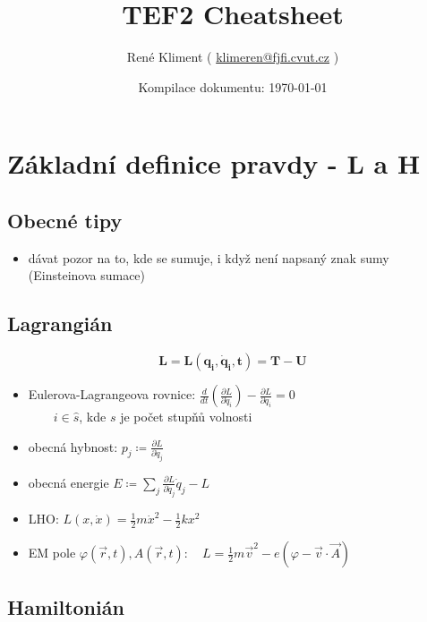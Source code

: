 \documentclass[a5paper,12pt]{article}
\author{
  René Kliment 
  ( \href{mailto:klimeren@fjfi.cvut.cz}{klimeren@fjfi.cvut.cz} )
}
\title{TEF2 Cheatsheet}
\date{Kompilace dokumentu: \today}
\begin{document}
\maketitle
\tableofcontents

\newpage


\section{Základní definice pravdy - L a H}

\subsection*{Obecné tipy}
\begin{itemize}
 \item dávat pozor na to, kde se sumuje, i když není napsaný znak sumy (Einsteinova sumace)
\end{itemize}


\subsection{Lagrangián}

\begin{equation*}
	\boldsymbol{L=L(q_i, \dot{q}_i, t) = T - U}
\end{equation*}

\begin{itemize}
	\item Eulerova-Lagrangeova rovnice: $\frac{d}{dt} (\frac{\partial L}{\partial \dot{q}_i}) - \frac{\partial L}{\partial q_i} = 0$\\
	$\qquad i \in \hat{s}$, kde $s$ je počet stupňů volnosti
	\item obecná hybnost: $p_j \coloneqq \frac{\partial L}{\partial \dot{q}_j}$
	\item obecná energie $E \coloneqq \sum_{j} \frac{\partial L}{\partial \dot{q}_j}\dot{q}_j - L$
	\item LHO: $L(x, \dot{x}) = \frac{1}{2}m\dot{x}^2 - \frac{1}{2}kx^2$
	\item EM pole $\varphi(\vec{r}, t), A(\vec{r}, t): \quad L = \frac{1}{2}m\vec{v}^2 - e(\varphi - \vec{v} \cdot \vec{A})$
\end{itemize}

\subsection{Hamiltonián}
\end{document}
